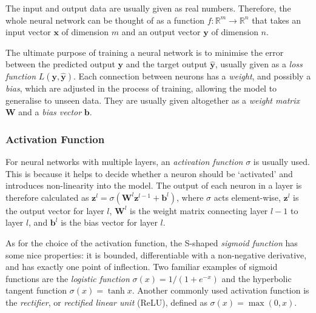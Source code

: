 \documentclass[a4paper,11pt, titlepage]{article}
\theoremstyle{definition}
\theoremstyle{plain}
\theoremstyle{remark}
\begin{document}
The input and output data are usually given as real numbers. Therefore, the whole neural network can be thought of as a function $f:\mathbb{R}^m\rightarrow\mathbb{R}^n$ that takes an input vector $\mathbf{x}$ of dimension $m$ and an output vector $\mathbf{y}$ of dimension $n$.

The ultimate purpose of training a neural network is to minimise the error between the predicted output $\mathbf{y}$ and the target output $\mathbf{\hat{y}}$, usually given as a \textit{loss function} $L(\mathbf{y}, \mathbf{\hat{y}})$. Each connection between neurons has a \textit{weight}, and possibly a \textit{bias}, which are adjusted in the process of training, allowing the model to generalise to unseen data. They are usually given altogether as a \textit{weight matrix} $\mathbf{W}$ and a \textit{bias vector} $\mathbf{b}$.

\subsubsection{Activation Function}

For neural networks with multiple layers, an \textit{activation function} $\sigma$ is usually used. This is because it helps to decide whether a neuron should be ‘activated’ and introduces non-linearity into the model. The output of each neuron in a layer is therefore calculated as $\mathbf{z}^l=\sigma\left(\mathbf{W}^l\mathbf{z}^{l-1}+\mathbf{b}^l\right)$, where $\sigma$ acts element-wise, $\mathbf{z}^l$ is the output vector for layer $l$, $\mathbf{W}^l$ is the weight matrix connecting layer $l-1$ to layer $l$, and $\mathbf{b}^l$ is the bias vector for layer $l$. 

As for the choice of the activation function, the S-shaped \textit{sigmoid function} has some nice properties: it is bounded, differentiable with a non-negative derivative, and has exactly one point of inflection. Two familiar examples of sigmoid functions are the \textit{logistic function} $\sigma(x)=1/\left(1+e^{-x}\right)$ and the hyperbolic tangent function $\sigma(x)=\tanh x$. Another commonly used activation function is the \textit{rectifier}, or \textit{rectified linear unit} (ReLU), defined as $\sigma(x)=\max(0, x)$.
\end{document}
